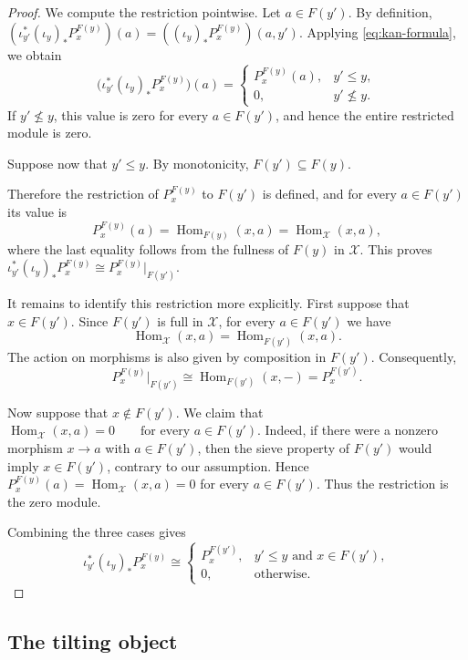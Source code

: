 \documentclass[12pt,a4paper,english,reqno]{amsart}
\theoremstyle{plain}
\theoremstyle{definition}
\newcommand{\Hom}{\operatorname{Hom}}
\newcommand{\X}{\mathcal X}
\begin{document}
\begin{proof}
We compute the restriction pointwise. Let $a\in F(y')$. By definition,
$(\iota_{y'}^*(\iota_y)_*P_x^{F(y)})(a)
=((\iota_y)_*P_x^{F(y)})(a,y')$.
Applying \eqref{eq:kan-formula}, we obtain
\[
\bigl(\iota_{y'}^*(\iota_y)_*P_x^{F(y)}\bigr)(a)
=
\begin{cases}
P_x^{F(y)}(a), & y'\leq y,\\
0,              & y'\nleq y.
\end{cases}
\]
If $y'\nleq y$, this value is zero for every $a\in F(y')$, and hence
the entire restricted module is zero.

Suppose now that $y'\leq y$. By monotonicity, $F(y')\subseteq F(y)$.

Therefore the restriction of $P_x^{F(y)}$ to $F(y')$ is defined, and
for every $a\in F(y')$ its value is
\[
P_x^{F(y)}(a)
=
\Hom_{F(y)}(x,a)
=
\Hom_{\X}(x,a),
\]
where the last equality follows from the fullness of $F(y)$ in $\X$.
This proves $\iota_{y'}^*(\iota_y)_*P_x^{F(y)}
\cong
P_x^{F(y)}\vert_{F(y')}$.

It remains to identify this restriction more explicitly. First suppose
that $x\in F(y')$.
Since $F(y')$ is full in $\X$, for every $a\in F(y')$ we have
\[
\Hom_{\X}(x,a)
=
\Hom_{F(y')}(x,a).
\]
The action on morphisms is also given by composition in $F(y')$.
Consequently,
\[
P_x^{F(y)}\vert_{F(y')}
\cong
\Hom_{F(y')}(x,-)
=
P_x^{F(y')}.
\]

Now suppose that $x\notin F(y')$. We claim that $\Hom_{\X}(x,a)=0
\qquad
\text{for every }a\in F(y')$.
Indeed, if there were a nonzero morphism $x\longrightarrow a$
with $a\in F(y')$, then the sieve property of $F(y')$ would imply $x\in F(y')$,
contrary to our assumption. Hence $P_x^{F(y)}(a)=\Hom_{\X}(x,a)=0$
for every $a\in F(y')$. Thus the restriction is the zero module.

Combining the three cases gives
\[
\iota_{y'}^*(\iota_y)_*P_x^{F(y)}
\cong
\begin{cases}
P_x^{F(y')},
  & y'\leq y\text{ and }x\in F(y'),\\
0,
  & \text{otherwise}.
\end{cases}
\]
\end{proof}








\subsection{The tilting object}
\end{document}
